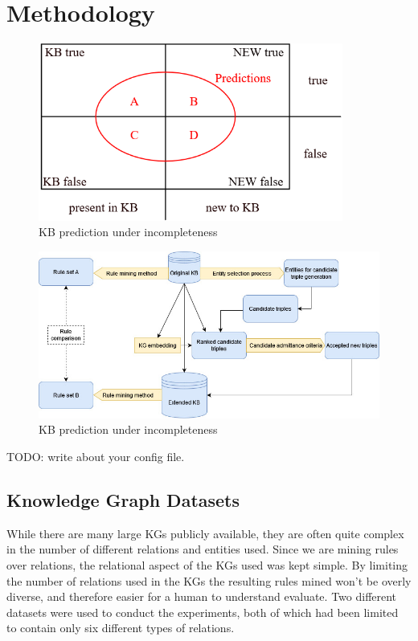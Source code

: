 \chapter{Methodology}

\begin{figure}[htp]
    \centering
    \includegraphics[width=10cm]{figures/kb_venn.png}
    \caption{KB prediction under incompleteness}
\end{figure}

\begin{figure}[htp]
    \centering
    \includegraphics[width=12cm]{figures/ontology_mining_pipeline.jpg}
    \caption{KB prediction under incompleteness}
\end{figure}


TODO: write about your config file.

\section{Knowledge Graph Datasets}
While there are many large KGs publicly available, they are often quite complex in the number of different relations and entities used. Since we are mining rules over relations, the relational aspect of the KGs used was kept simple. By limiting the number of relations used in the KGs the resulting rules mined won't be overly diverse, and therefore easier for a human to understand evaluate. Two different datasets were used to conduct the experiments, both of which had been limited to contain only six different types of relations.


